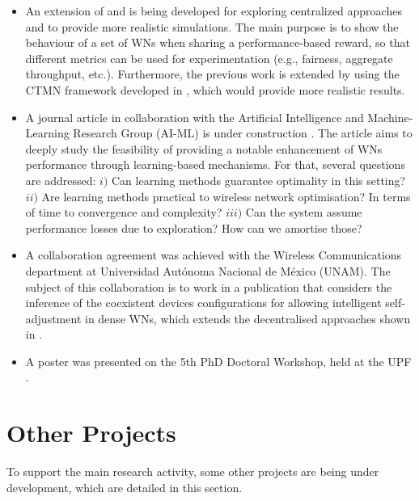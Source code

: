 \documentclass[12pt, a4paper,twoside]{tesi_upf}
\begin{document}
\begin{itemize}
				\item An extension of \cite{wilhelmi2017implications} and \cite{wilhelmi2017enhancing} is being developed for exploring centralized approaches and to provide more realistic simulations. The main purpose is to show the behaviour of a set of WNs when sharing a performance-based reward, so that different metrics can be used for experimentation (e.g., fairness, aggregate throughput, etc.). Furthermore, the previous work is extended by using the CTMN framework developed in \cite{barrachina2017ctmn}, which would provide more realistic results. 
				\item A journal article in collaboration with the Artificial Intelligence and Machine-Learning Research Group (AI-ML) is under construction \cite{bellalta2017learning}. The article aims to deeply study the feasibility of providing a notable enhancement of WNs performance through learning-based mechanisms. For that, several questions are addressed: $i)$ Can learning methods guarantee optimality in this setting? $ii)$ Are learning methods practical to wireless network optimisation? In terms of time to convergence and complexity? $iii)$ Can the system assume performance losses due to exploration? How can we amortise those?
				\item A collaboration agreement was achieved with the Wireless Communications department at Universidad Aut\'onoma Nacional de M\'exico (UNAM). The subject of this collaboration is to work in a publication that considers the inference of the coexistent devices configurations for allowing intelligent self-adjustment in dense WNs, which extends the decentralised approaches shown in \cite{wilhelmi2017implications, wilhelmi2017enhancing}.
				\item A poster was presented on the 5th PhD Doctoral Workshop, held at the UPF \cite{wilhelmi2017improving}.
			\end{itemize}	
			
		\section{Other Projects}
		\label{section:other_projects}	
			To support the main research activity, some other projects are being under development, which are detailed in this section.
\end{document}
